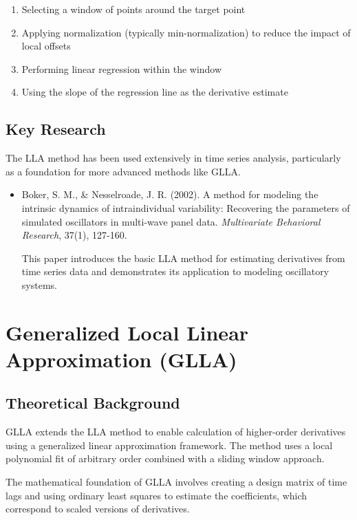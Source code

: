 \documentclass{article}
\begin{document}
\begin{enumerate}
    \item Selecting a window of points around the target point
    \item Applying normalization (typically min-normalization) to reduce the impact of local offsets
    \item Performing linear regression within the window
    \item Using the slope of the regression line as the derivative estimate
\end{enumerate}

\subsection{Key Research}

The LLA method has been used extensively in time series analysis, particularly as a foundation for more advanced methods like GLLA.

\begin{itemize}
    \item Boker, S. M., \& Nesselroade, J. R. (2002). A method for modeling the intrinsic dynamics of intraindividual variability: Recovering the parameters of simulated oscillators in multi-wave panel data. \textit{Multivariate Behavioral Research}, 37(1), 127-160.
    
    This paper introduces the basic LLA method for estimating derivatives from time series data and demonstrates its application to modeling oscillatory systems.
\end{itemize}

\section{Generalized Local Linear Approximation (GLLA)}

\subsection{Theoretical Background}

GLLA extends the LLA method to enable calculation of higher-order derivatives using a generalized linear approximation framework. The method uses a local polynomial fit of arbitrary order combined with a sliding window approach.

The mathematical foundation of GLLA involves creating a design matrix of time lags and using ordinary least squares to estimate the coefficients, which correspond to scaled versions of derivatives.
\end{document}
